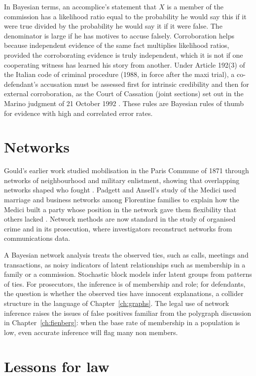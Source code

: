 In Bayesian terms, an accomplice's statement that $X$ is a member of the commission has a likelihood ratio equal to the probability he would say this if it were true divided by the probability he would say it if it were false. The denominator is large if he has motives to accuse falsely. Corroboration helps because independent evidence of the same fact multiplies likelihood ratios, provided the corroborating evidence is truly independent, which it is not if one cooperating witness has learned his story from another. Under Article 192(3) of the Italian code of criminal procedure (1988, in force after the maxi trial), a co-defendant's accusation must be assessed first for intrinsic credibility and then for external corroboration, as the Court of Cassation (joint sections) set out in the Marino judgment of 21 October 1992 \citep{cassazione1992}. These rules are Bayesian rules of thumb for evidence with high and correlated error rates.

\section{Networks}

Gould's earlier work studied mobilisation in the Paris Commune of 1871 through networks of neighbourhood and military enlistment, showing that overlapping networks shaped who fought \citep{gould1991}. Padgett and Ansell's study of the Medici used marriage and business networks among Florentine families to explain how the Medici built a party whose position in the network gave them flexibility that others lacked \citep{padgett1993}. Network methods are now standard in the study of organised crime and in its prosecution, where investigators reconstruct networks from communications data.

A Bayesian network analysis treats the observed ties, such as calls, meetings and transactions, as noisy indicators of latent relationships such as membership in a family or a commission. Stochastic block models infer latent groups from patterns of ties. For prosecutors, the inference is of membership and role; for defendants, the question is whether the observed ties have innocent explanations, a collider structure in the language of Chapter~\ref{ch:graphs}. The legal use of network inference raises the issues of false positives familiar from the polygraph discussion in Chapter~\ref{ch:fienberg}: when the base rate of membership in a population is low, even accurate inference will flag many non members.

\section{Lessons for law}

